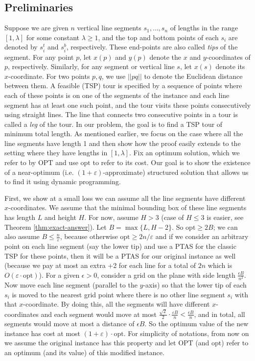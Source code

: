\documentclass[pdflatex,sn-mathphys-num]{sn-jnl}
\theoremstyle{thmstyleone}
\newcommand{\eps}{\varepsilon}
\newcommand{\opt}{{\text{opt}}}
\newcommand{\OPT}{{\text{OPT}}}
\begin{document}
\subsection{Preliminaries}\label{sec:prem}
Suppose we are given $n$ vertical line segments $s_1,\ldots,s_n$ of lengths in the range $[1,\lambda]$ for some constant $\lambda \ge 1$, and the top and bottom points of each $s_i$ are denoted by $s^t_i$ and $s^b_i$, respectively. These end-points are also called {\em tips} of the segment. For any point $p$, let $ x(p) $ and $ y(p) $ denote the $x$ and $y$-coordinates of $p$, respectively. Similarly, for any segment or vertical line $s$, let $ x(s) $ denote its $x$-coordinate.
For two points $p,q$, we use $||pq||$ to denote the Euclidean distance between them.
A feasible (TSP) tour is specified by a sequence of points where each of these points is on one of the segments of the instance and each line segment has at least one such point, and the tour visits these points consecutively using straight lines. The line that connects two consecutive points in a tour is called a {\em leg} of the tour.
In our problem, the goal is to find a TSP tour of minimum total length. As mentioned earlier, we focus on the case where all the line segments have length 1 and then show how the proof easily extends to the setting where they have lengths in $[1,\lambda]$.
Fix an optimum solution, which we refer to by $\OPT$ and use
$\opt$ to refer to its cost. Our goal is to show the existence of a near-optimum (i.e. $(1+\eps)$-approximate) structured solution that allows us to find it using dynamic programming.


First, we show at a small loss we can assume all the line segments have different $x$-coordinates.
We assume that the minimal bounding box of these line segments has length $L$ and height $H$. For now, assume $ H > 3 $ (case of $H\leq 3$ is easier, see Theorem \ref{thm:exact-answer}). Let $ B = \max \{L, H-2\} $. So $\opt\geq 2B$; we can also assume $B\leq \frac{n}{\eps}$, because otherwise $\opt\geq 2n/\eps$ and if we consider an arbitrary point on each line segment (say the lower tip) and use a PTAS for the classic TSP for these points, then it will be a PTAS for our original instance as well (because we pay at most an extra +2 for each line for a total of $2n$ which is $O(\eps\cdot\opt)$).
For a given $ \epsilon > 0 $, consider a grid on the plane with side length $ \frac{\epsilon B}{n^2}$. Now move each line segment (parallel to the $y$-axis) so that the lower tip of each $s_i $ is moved to the nearest grid point where there is no other line segment $s_i$ with that $x$-coordinate. By doing this, all the segments will have different $x$-coordinates and each segment would move at most $\frac{\sqrt 2}2\cdot\frac{\eps B}n < \frac{\epsilon B}n $, and in total, all segments would move at most a distance of $\epsilon B$. So the optimum value of the new instance has cost at most $(1+\eps)\cdot\opt$.
For simplicity of notations, from now on we assume the original instance has this property and let $\OPT$ (and $\opt$) refer to an optimum (and its value) of this modified instance.
\end{document}
